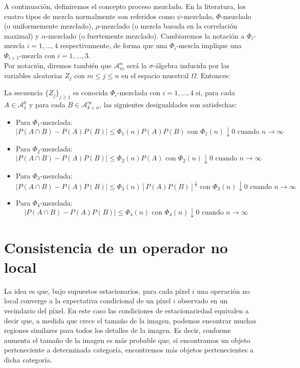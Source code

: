 A continuación, definiremos el concepto proceso mezclado. En la literatura, los cuatro tipos de mezcla normalmente son referidos como $\psi$-mezclado, $\Phi$-mezclado (o uniformemente mezclado), $\rho$-mezclado (o mezcla basada en la correlación maximal) y $\alpha$-mezclado (o fuertemente mezclado). Cambiaremos la notación a $\Phi_i$-mezcla $i=1,...,4$ respectivamente, de forma que una $\Phi_i$-mezcla implique una $\Phi_{i+1}$-mezcla con $i=1,...,3$.\\

Por notación, diremos también que $\mathscr{A}_m^n$ será la $\sigma$-álgebra inducida por las variables aleatorias $Z_j$ con $m\le j \le n$ en el espacio muestral $\Omega$. Entonces:\\

\begin{definicion}\label{def:mezcla}
La secuencia $\{Z_j\}_{j\ge 1}$ es conocida $\Phi_i$-mezclada con $i=1,...,4$ si, para cada $A \in \mathscr{A}_1^k$ y para cada $B\in \mathscr{A}_{k+n}^{\infty}$, las siguientes desigualdades son satisfechas:
\begin{itemize}
\item Para $\Phi_1$-mezclada: $$|P(A\cap B) - P(A)P(B)| \le \Phi_1 (n)P(A)P(B)\text{ con } \Phi_1(n)\downarrow 0 \text{ cuando } n\to \infty$$
\item Para $\Phi_2$-mezclada: $$|P(A\cap B) - P(A)P(B)| \le \Phi_2 (n)P(A)\text{ con } \Phi_2(n)\downarrow 0 \text{ cuando } n\to \infty$$
\item Para $\Phi_3$-mezclada: $$|P(A\cap B) - P(A)P(B)| \le \Phi_3 (n)[P(A)P(B)]^\frac{1}{2} \text{ con } \Phi_3(n)\downarrow 0 \text{ cuando } n\to \infty$$
\item Para $\Phi_4$-mezclada: $$|P(A\cap B) - P(A)P(B)| \le \Phi_4 (n) \text{ con } \Phi_4(n)\downarrow 0 \text{ cuando } n\to \infty$$
\end{itemize}
\end{definicion}

\section{Consistencia de un operador no local}
La idea es que, bajo supuestos estacionarios, para cada píxel $i$ una operación no local converge a la expectativa condicional de un píxel $i$ observado en un vecindario del píxel. En este caso las condiciones de estacionariedad equivalen a decir que, a medida que crece el tamaño de la imagen, podemos encontrar muchas regiones similares para todos los detalles de la imagen. Es decir, conforme aumenta el tamaño de la imagen es más probable que, si encontramos un objeto perteneciente a determinada categoría, encontremos más objetos pertenecientes a dicha categoría.\\

